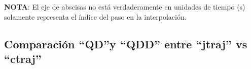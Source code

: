 \documentclass[a4paper,12pt]{article}
\begin{document}
\textbf{NOTA}: El eje de abscisas no está verdaderamente en unidades de tiempo (s)
solamente representa el índice del paso en la interpolación.

\subsection{Comparación ``QD''y ``QDD'' entre ``jtraj'' vs ``ctraj''}




\end{document}
